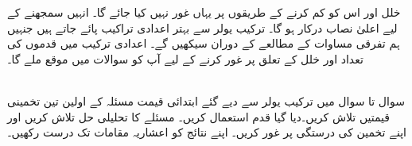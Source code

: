 خلل اور اس کو کم کرنے کے طریقوں پر یہاں غور نہیں کیا جائے گا۔ انہیں سمجھنے کے لیے اعلیٰ  نصاب درکار ہو گا۔ ترکیب یولر سے  بہتر اعدادی تراکیب پائے جاتے ہیں جنہیں  ہم تفرقی مساوات  کے مطالعے  کے دوران سیکھیں گے۔ اعدادی ترکیب میں قدموں کی تعداد اور خلل کے تعلق پر غور کرنے کے لیے آپ کو سوالات میں موقع ملے گا۔


\\
سوال  تا سوال  میں ترکیب یولر سے دیے گئے ابتدائی قیمت مسئلہ کے اولین تین تخمینی قیمتیں تلاش کریں۔دیا گیا قدم استعمال کریں۔ مسئلے کا تحلیلی حل تلاش کریں اور اپنے تخمین کی درستگی پر غور کریں۔ اپنے نتائج کو  اعشاریہ مقامات تک درست رکھیں۔

